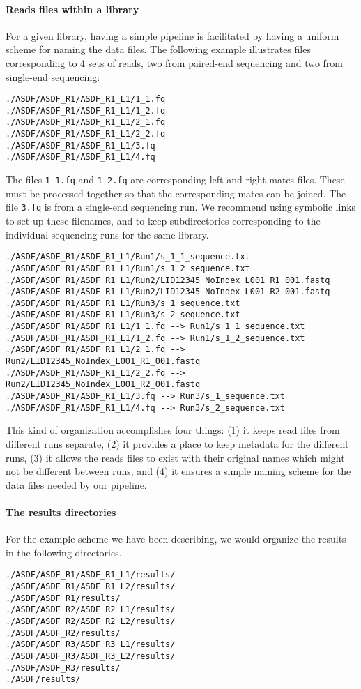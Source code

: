 \documentclass[10pt]{article}
\newcommand{\fn}[1]{\texttt{#1}}
\begin{document}
\paragraph{Reads files within a library}
For a given library, having a simple pipeline is facilitated by having
a uniform scheme for naming the data files. The following example
illustrates files corresponding to 4 sets of reads, two from
paired-end sequencing and two from single-end sequencing:
\begin{verbatim}
./ASDF/ASDF_R1/ASDF_R1_L1/1_1.fq
./ASDF/ASDF_R1/ASDF_R1_L1/1_2.fq
./ASDF/ASDF_R1/ASDF_R1_L1/2_1.fq
./ASDF/ASDF_R1/ASDF_R1_L1/2_2.fq
./ASDF/ASDF_R1/ASDF_R1_L1/3.fq
./ASDF/ASDF_R1/ASDF_R1_L1/4.fq
\end{verbatim}
The files \fn{1\_1.fq} and \fn{1\_2.fq} are corresponding left and
right mates files. These must be processed together so that the
corresponding mates can be joined. The file \fn{3.fq} is from a
single-end sequencing run. We recommend using symbolic links to set up
these filenames, and to keep subdirectories corresponding to the
individual sequencing runs for the same library.
\begin{verbatim}
./ASDF/ASDF_R1/ASDF_R1_L1/Run1/s_1_1_sequence.txt
./ASDF/ASDF_R1/ASDF_R1_L1/Run1/s_1_2_sequence.txt
./ASDF/ASDF_R1/ASDF_R1_L1/Run2/LID12345_NoIndex_L001_R1_001.fastq
./ASDF/ASDF_R1/ASDF_R1_L1/Run2/LID12345_NoIndex_L001_R2_001.fastq
./ASDF/ASDF_R1/ASDF_R1_L1/Run3/s_1_sequence.txt
./ASDF/ASDF_R1/ASDF_R1_L1/Run3/s_2_sequence.txt
./ASDF/ASDF_R1/ASDF_R1_L1/1_1.fq --> Run1/s_1_1_sequence.txt
./ASDF/ASDF_R1/ASDF_R1_L1/1_2.fq --> Run1/s_1_2_sequence.txt
./ASDF/ASDF_R1/ASDF_R1_L1/2_1.fq --> Run2/LID12345_NoIndex_L001_R1_001.fastq
./ASDF/ASDF_R1/ASDF_R1_L1/2_2.fq --> Run2/LID12345_NoIndex_L001_R2_001.fastq
./ASDF/ASDF_R1/ASDF_R1_L1/3.fq --> Run3/s_1_sequence.txt
./ASDF/ASDF_R1/ASDF_R1_L1/4.fq --> Run3/s_2_sequence.txt
\end{verbatim}
This kind of organization accomplishes four things: (1) it keeps read
files from different runs separate, (2) it provides a place to keep
metadata for the different runs, (3) it allows the reads files to
exist with their original names which might not be different between
runs, and (4) it ensures a simple naming scheme for the data files
needed by our pipeline.

\paragraph{The results directories}
For the example scheme we have been describing, we would organize the
results in the following directories.
\begin{verbatim}
./ASDF/ASDF_R1/ASDF_R1_L1/results/
./ASDF/ASDF_R1/ASDF_R1_L2/results/
./ASDF/ASDF_R1/results/
./ASDF/ASDF_R2/ASDF_R2_L1/results/
./ASDF/ASDF_R2/ASDF_R2_L2/results/
./ASDF/ASDF_R2/results/
./ASDF/ASDF_R3/ASDF_R3_L1/results/
./ASDF/ASDF_R3/ASDF_R3_L2/results/
./ASDF/ASDF_R3/results/
./ASDF/results/
\end{verbatim}
\end{document}
